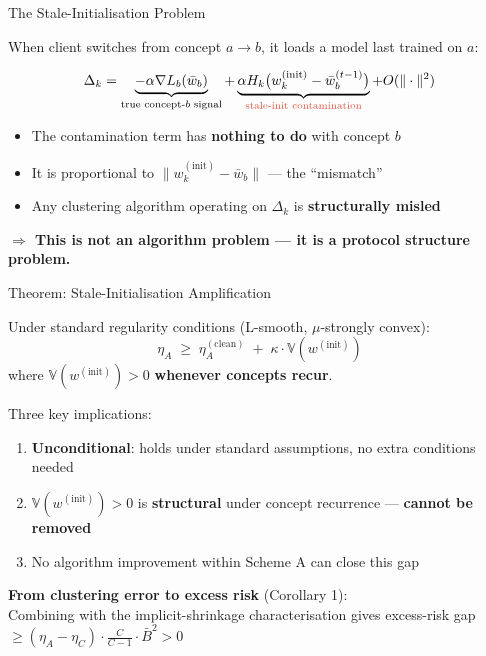 \documentclass[aspectratio=169,11pt]{beamer}
\newcommand{\V}{\mathbb{V}}
\newcommand{\wbar}{\bar{w}}
\begin{document}
\begin{frame}{The Stale-Initialisation Problem}

When client switches from concept $a \to b$, it loads a model last trained on $a$:

\begin{equation*}
\Delta_k = \underbrace{-\alpha \nabla L_b(\wbar_b)}_{\text{true concept-}b\text{ signal}}
          + \underbrace{\alpha H_k \bigl(w_k^{(\mathrm{init})} - \wbar_b^{(t-1)}\bigr)}_{\textcolor{cA}{\text{stale-init contamination}}}
          + O(\|\cdot\|^2)
\end{equation*}

\begin{itemize}
  \item The contamination term has \textbf{nothing to do} with concept $b$
  \item It is proportional to $\|w_k^{(\mathrm{init})} - \wbar_b\|$ --- the ``mismatch''
  \item Any clustering algorithm operating on $\Delta_k$ is \textbf{structurally misled}
\end{itemize}

\vspace{4pt}
\centering
\textcolor{cA}{\textbf{$\Rightarrow$ This is not an algorithm problem --- it is a protocol structure problem.}}
\end{frame}

\begin{frame}{Theorem: Stale-Initialisation Amplification}

\begin{theorem}
Under standard regularity conditions (L-smooth, $\mu$-strongly convex):
\begin{equation*}
\boxed{\eta_A \;\geq\; \eta_A^{(\mathrm{clean})} \;+\; \kappa \cdot \V(w^{(\mathrm{init})})}
\end{equation*}
where $\V(w^{(\mathrm{init})}) > 0$ \textbf{whenever concepts recur}.
\end{theorem}

\vspace{6pt}
Three key implications:
\begin{enumerate}
  \item \textbf{Unconditional}: holds under standard assumptions, no extra conditions needed
  \item $\V(w^{(\mathrm{init})}) > 0$ is \textbf{structural} under concept recurrence --- \textbf{cannot be removed}
  \item No algorithm improvement within Scheme A can close this gap
\end{enumerate}

\vspace{6pt}
\textbf{From clustering error to excess risk} (Corollary 1):\\[2pt]
Combining with the implicit-shrinkage characterisation gives excess-risk gap\\
$\geq (\eta_A - \eta_C) \cdot \frac{C}{C-1} \cdot \bar{B}^2 > 0$
\end{frame}
\end{document}
